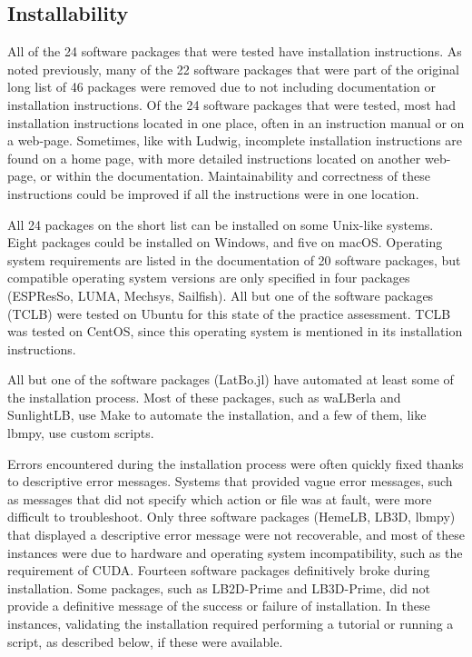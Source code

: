 \documentclass[final, 3p, times, authoryear]{elsarticle}
\begin{document}
\subsection{Installability}

All of the 24 software packages that were tested have installation instructions.
As noted previously, many of the 22 software packages that were part of the
original long list of 46 packages were removed due to not including
documentation or installation instructions. Of the 24 software packages that
were tested, most had installation instructions located in one place, often in
an instruction manual or on a web-page. Sometimes, like with Ludwig, incomplete
installation instructions are found on a home page, with more detailed
instructions located on another web-page, or within the documentation.
Maintainability and correctness of these instructions could be improved if all
the instructions were in one location. 

All 24 packages on the short list can be installed on some Unix-like systems.
Eight packages could be installed on Windows, and five on macOS. Operating system requirements are listed in the documentation of 20 software packages, but compatible operating system versions are only specified in four packages (ESPResSo, LUMA, Mechsys, Sailfish). All but one of the software packages (TCLB) were tested on Ubuntu for this state of the practice assessment. TCLB was tested on CentOS, since this operating system is mentioned in its installation instructions.

All but one of the software packages (LatBo.jl) have automated at least some of
the installation process. Most of these packages, such as waLBerla and
SunlightLB, use Make to automate the installation, and a few of them, like
lbmpy, use custom scripts.

Errors encountered during the installation process were often quickly fixed
thanks to descriptive error messages. Systems that provided vague error
messages, such as messages that did not specify which action or file was at
fault, were more difficult to troubleshoot. Only three software packages
(HemeLB, LB3D, lbmpy) that displayed a descriptive error message were not
recoverable, and most of these instances were due to hardware and operating
system incompatibility, such as the requirement of CUDA. Fourteen software
packages definitively broke during installation. Some packages, such as
LB2D-Prime and LB3D-Prime, did not provide a definitive message of the success
or failure of installation. In these instances, validating the installation
required performing a tutorial or running a script, as described below, if these
were available. 
\end{document}
